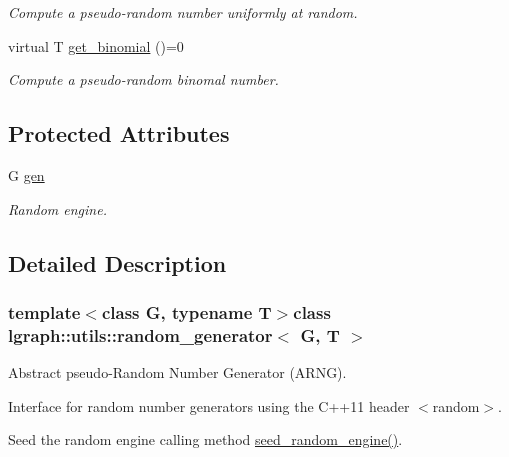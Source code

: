 \begin{DoxyCompactItemize}
\begin{DoxyCompactList}\small\item\em Compute a pseudo-\/random number uniformly at random. \end{DoxyCompactList}\item 
\hypertarget{classlgraph_1_1utils_1_1random__generator_a721da14c38e38d28559e8c617e0bdde2}{virtual T \hyperlink{classlgraph_1_1utils_1_1random__generator_a721da14c38e38d28559e8c617e0bdde2}{get\-\_\-binomial} ()=0}\label{classlgraph_1_1utils_1_1random__generator_a721da14c38e38d28559e8c617e0bdde2}

\begin{DoxyCompactList}\small\item\em Compute a pseudo-\/random binomal number. \end{DoxyCompactList}\end{DoxyCompactItemize}
\subsection*{Protected Attributes}
\begin{DoxyCompactItemize}
\item 
\hypertarget{classlgraph_1_1utils_1_1random__generator_a18353876b4c2d3a18aee454b5750a0a0}{G \hyperlink{classlgraph_1_1utils_1_1random__generator_a18353876b4c2d3a18aee454b5750a0a0}{gen}}\label{classlgraph_1_1utils_1_1random__generator_a18353876b4c2d3a18aee454b5750a0a0}

\begin{DoxyCompactList}\small\item\em Random engine. \end{DoxyCompactList}\end{DoxyCompactItemize}


\subsection{Detailed Description}
\subsubsection*{template$<$class G, typename T$>$class lgraph\-::utils\-::random\-\_\-generator$<$ G, T $>$}

Abstract pseudo-\/\-Random Number Generator (A\-R\-N\-G). 

Interface for random number generators using the C++11 header $<$random$>$.

Seed the random engine calling method \hyperlink{classlgraph_1_1utils_1_1random__generator_a4eb6998070eecb59bd89dca92d8a509c}{seed\-\_\-random\-\_\-engine()}.

